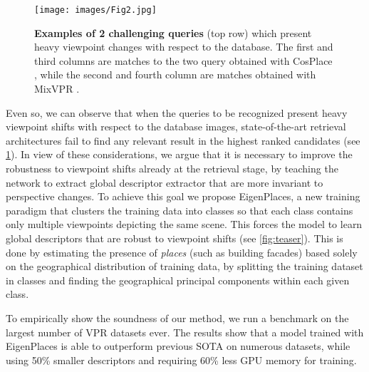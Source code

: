 \documentclass[10pt,twocolumn,letterpaper]{article}
\begin{document}
\begin{figure}
        \begin{center}
    \texttt{[image: images/Fig2.jpg]}
    \end{center}
    \caption{\textbf{Examples of 2 challenging queries}
    (top row)
    which present heavy viewpoint changes with respect to the database.
    The first and third columns are matches to the two query obtained with CosPlace \cite{Berton_2022_cosPlace}, while the second and fourth column are matches obtained with MixVPR \cite{Alibey_2023_mixvpr}.}
    \label{fig:difficult_queries}
\end{figure}











 Even so, we can observe that when the queries to be recognized present heavy viewpoint shifts with respect to the database images, state-of-the-art retrieval architectures fail to find any relevant result in the highest ranked candidates (see \cref{fig:difficult_queries}). 
In view of these considerations, we argue that it is necessary to improve the robustness to viewpoint shifts already at the retrieval stage, by teaching the network to extract global descriptor extractor that are more invariant to perspective changes.
To achieve this goal we propose EigenPlaces, a new training paradigm that clusters the training data into classes so that each class contains only multiple viewpoints depicting the same scene. This forces the model to learn global descriptors that are robust to viewpoint shifts (see \cref{fig:teaser}).
This is done by estimating the presence of \textit{places} (such as building facades) based solely on the geographical distribution of training data, by splitting the training dataset in classes and finding the geographical principal components within each given class.

To empirically show the soundness of our method, we run a benchmark on the largest number of VPR datasets ever. The results show that a model trained with EigenPlaces is able to outperform previous SOTA on numerous datasets, while using 50\% smaller descriptors and requiring 60\% less GPU memory for training.
\end{document}
